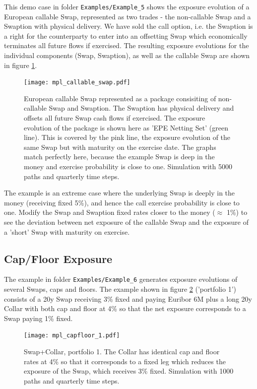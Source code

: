 \documentclass[12pt, a4paper]{article}
\begin{document}
This demo case in folder {\tt Examples/Example\_5} shows the exposure evolution of a European callable Swap, represented
as two trades - the non-callable Swap and a Swaption with physical delivery. We have sold the call option, i.e. the
Swaption is a right for the counterparty to enter into an offsetting Swap which economically terminates all future flows
if exercised. The resulting exposure evolutions for the individual components (Swap, Swaption), as well as the callable
Swap are shown in figure \ref{fig_4}.
\begin{figure}[h!]
\begin{center}
\texttt{[image: mpl\_callable\_swap.pdf]}
\end{center}
\caption{European callable Swap represented as a package consisiting of non-callable Swap and Swaption. The Swaption has
  physical delivery and offsets all future Swap cash flows if exercised. The exposure evolution of the package is shown
  here as 'EPE Netting Set' (green line). This is covered by the pink line, the exposure evolution of the same Swap but
  with maturity on the exercise date. The graphs match perfectly here, because the example Swap is deep in the money and
  exercise probability is close to one. Simulation with 5000 paths and quarterly time steps.}
\label{fig_4}
\end{figure}
The example is an extreme case where the underlying Swap is deeply in the money (receiving fixed 5\%), and hence the
call exercise probability is close to one. Modify the Swap and Swaption fixed rates closer to the money ($\approx$ 1\%)
to see the deviation between net exposure of the callable Swap and the exposure of a 'short' Swap with maturity on
exercise.

\subsection{Cap/Floor Exposure}\label{sec:capfloor}

The example in folder {\tt Examples/Example\_6} generates exposure evolutions of several Swaps, caps and floors. The
example shown in figure \ref{fig_capfloor_1} ('portfolio 1') consists of a 20y Swap receiving 3\% fixed and paying
Euribor 6M plus a long 20y Collar
with both cap and floor at 4\% so that the net exposure corresponds to a Swap paying 1\% fixed. \\

\begin{figure}[h!]
\begin{center}
\texttt{[image: mpl\_capfloor\_1.pdf]}
\end{center}
\caption{Swap+Collar, portfolio 1. The Collar has identical cap and floor rates at 4\% so that it corresponds to a
  fixed leg which reduces the exposure of the Swap, which receives 3\% fixed. Simulation with 1000 paths and quarterly
  time steps.}
\label{fig_capfloor_1}
\end{figure}
\end{document}
